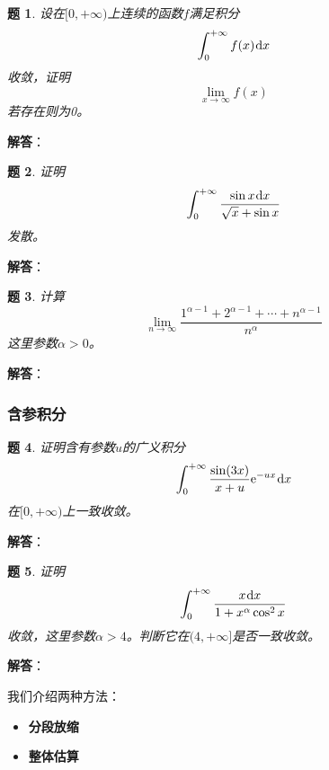 \documentclass[a4paper,UTF8,fontset=windows,AutoFakeBold]{ctexart}
\newcommand*{\dr}{\hspace{0.07em}\mathrm{d}}
\newcommand*{\er}{\mathrm{e}}
\theoremstyle{ex}
\newtheorem{exercise}{题}
\newcommand{\sol}[1]{{\vspace{5pt}\kaishu\noindent\textbf{解答}：\vspace{-3pt}
\begin{compactitem}
    \item[] #1
\end{compactitem}
}}
\begin{document}
\begin{framed}
\begin{exercise}
    设在$[0,+\infty)$上连续的函数$f$满足积分
    $$\int_0^{+\infty}f(x)\dr x$$
    收敛，证明
    $$\lim_{x\to\infty}f(x)$$
    若存在则为0。
\end{exercise}
\sol{

}
\end{framed}

\begin{framed}
\begin{exercise}
    证明
    $$\int_0^{+\infty}\frac{\sin x\dr x}{\sqrt{x}+\sin x}$$
    发散。
\end{exercise}
\sol{

}
\end{framed}

\begin{framed}
\begin{exercise}
    计算
    $$\lim_{n\to\infty}\frac{1^{\alpha-1}+2^{\alpha-1}+\cdots+n^{\alpha-1}}{n^\alpha}$$
    这里参数$\alpha>0$。
\end{exercise}
\sol{

}
\end{framed}

\subsubsection{含参积分}

\begin{framed}
\begin{exercise}
    证明含有参数$u$的广义积分
    $$\int_0^{+\infty}\frac{\sin(3x)}{x+u}\er^{-ux}\dr x$$
    在$[0,+\infty)$上一致收敛。
\end{exercise}
\sol{

}
\end{framed}

\begin{framed}
\begin{exercise}
    证明
    $$\int_0^{+\infty}\frac{x\dr x}{1+x^\alpha\cos^2x}$$
    收敛，这里参数$\alpha>4$。判断它在$(4,+\infty]$是否一致收敛。
\end{exercise}
\sol{
    我们介绍两种方法：
    \begin{itemize}
        \item \textbf{分段放缩}
        
        \item \textbf{整体估算}
        
        
    \end{itemize}
}
\end{framed}
\end{document}
